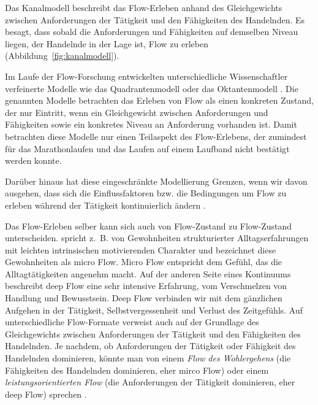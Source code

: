 Das Kanalmodell beschreibt das Flow-Erleben anhand des Gleichgewichts zwischen Anforderungen der Tätigkeit und den Fähigkeiten des Handelnden. Es besagt, dass sobald die Anforderungen und Fähigkeiten auf demselben Niveau liegen, der Handelnde in der Lage ist, Flow zu erleben (Abbildung~\ref{fig:kanalmodell}). 

Im Laufe der Flow-Forschung entwickelten unterschiedliche Wissenschaftler verfeinerte Modelle wie das Quadrantenmodell \citep[S.~286]{Csikszentmihalyi1995} oder das Oktantenmodell \citep[S.~296]{Massimini1995}. Die genannten Modelle betrachten das Erleben von Flow als einen konkreten Zustand, der nur Eintritt, wenn ein Gleichgewicht zwischen Anforderungen und Fähigkeiten sowie ein konkretes Niveau an Anforderung vorhanden ist. Damit betrachten diese Modelle nur einen Teilaspekt des Flow-Erlebens, der zumindest für das Marathonlaufen \citep{Stoll2005} und das Laufen auf einem Laufband \citep{Reinhardt2006} nicht bestätigt werden konnte. 

Darüber hinaus hat diese eingeschränkte Modellierung Grenzen, wenn wir davon ausgehen, dass sich die Einflussfaktoren bzw. die Bedingungen um Flow zu erleben während der Tätigkeit kontinuierlich ändern \citep{Grueter2016b}.

Das Flow-Erleben selber kann sich auch von Flow-Zustand zu Flow-Zustand unterscheiden. \citet[][S.~222]{Csikszentmihalyi2010} spricht z.~B. von Gewohnheiten strukturierter Alltagserfahrungen mit leichten intrinsischen motivierenden Charakter und bezeichnet diese Gewohnheiten als micro Flow. Micro Flow entspricht dem Gefühl, das die Alltagtätigkeiten angenehm macht. Auf der anderen Seite eines Kontinuums beschreibt deep Flow eine sehr intensive Erfahrung, vom Verschmelzen von Handlung und Bewusstsein. Deep Flow verbinden wir mit dem gänzlichen Aufgehen in der Tätigkeit, Selbstvergessenheit und Verlust des Zeitgefühls. Auf unterschiedliche Flow-Formate verweist auch \citet{Moneta2012} auf der Grundlage des Gleichgewichts zwischen Anforderungen der Tätigkeit und den Fähigkeiten des Handelnden. Je nachdem, ob Anforderungen der Tätigkeit oder Fähigkeit des Handelnden dominieren, könnte man von einem \emph{Flow des Wohlergehens} (die Fähigkeiten des Handelnden dominieren, eher mirco Flow) oder einem \emph{leistungsorientierten Flow} (die Anforderungen der Tätigkeit dominieren, eher deep Flow) sprechen \citep{Grueter2016b}.

